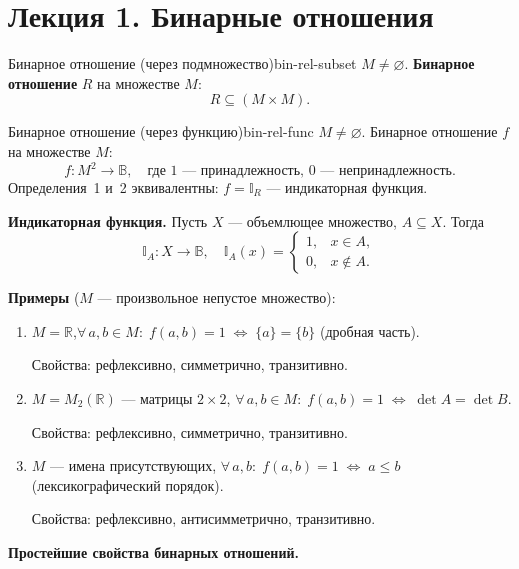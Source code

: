 \chapter{Лекция 1. Бинарные отношения}

\begin{defn}{Бинарное отношение (через подмножество)}{bin-rel-subset}
$M \neq \varnothing$. \textbf{Бинарное отношение} $R$ на множестве $M$:
\[
  R \subseteq (M \times M).
\]
\end{defn}

\begin{defn}{Бинарное отношение (через функцию)}{bin-rel-func}
$M \neq \varnothing$. Бинарное отношение $f$ на множестве $M$:
\[
  f\colon M^2 \to \mathbb{B}, \quad
  \text{где } 1 \text{ --- принадлежность, } 0 \text{ --- непринадлежность.}
\]
Определения~1 и~2 эквивалентны: $f = \mathbb{I}_R$ --- индикаторная функция.

\textbf{Индикаторная функция.}
Пусть $X$ --- объемлющее множество, $A \subseteq X$. Тогда
\[
  \mathbb{I}_A \colon X \to \mathbb{B}, \quad
  \mathbb{I}_A(x) =
  \begin{cases}
    1, & x \in A, \\
    0, & x \notin A.
  \end{cases}
\]
\end{defn}

\textbf{Примеры} ($M$ --- произвольное непустое множество):

\begin{enumerate}
  \item $M = \mathbb{R}$,\quad $\forall\, a, b \in M\colon\;
        f(a,b) = 1 \;\Leftrightarrow\; \{a\} = \{b\}$ (дробная часть).

        Свойства: рефлексивно, симметрично, транзитивно.

  \item $M = M_2(\mathbb{R})$ --- матрицы $2 \times 2$,\quad
        $\forall\, a, b \in M\colon\;
        f(a,b) = 1 \;\Leftrightarrow\; \det A = \det B$.

        Свойства: рефлексивно, симметрично, транзитивно.

  \item $M$ --- имена присутствующих,\quad
        $\forall\, a, b\colon\; f(a,b) = 1 \;\Leftrightarrow\; a \leq b$
        (лексикографический порядок).

        Свойства: рефлексивно, антисимметрично, транзитивно.
\end{enumerate}

\medskip
\textbf{Простейшие свойства бинарных отношений.}

